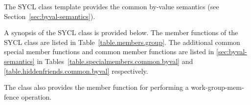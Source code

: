 The SYCL  class template provides the common by-value
semantics (see Section~\ref{sec:byval-semantics}).

A synopsis of the SYCL  class is provided below. The member functions of the SYCL  class are listed in Table~\ref{table.members.group}. The additional common special member functions and common member functions are listed in \ref{sec:byval-semantics} in Tables~\ref{table.specialmembers.common.byval} and \ref{table.hiddenfriends.common.byval} respectively.

The  class also provides the  member function for performing a \gls{work-group-mem-fence}
operation.


